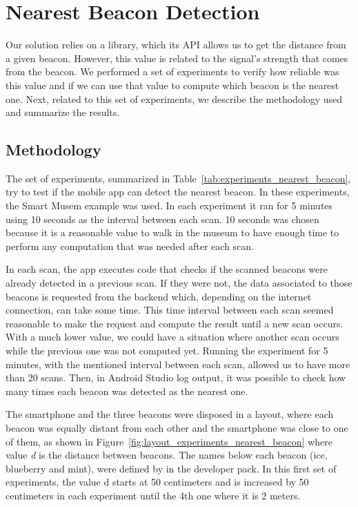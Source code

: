 \section{Nearest Beacon Detection}
\label{sec:evaluation_nearest_beacon}
Our solution relies on a library, which its \gls{API} allows us to get the distance from a given beacon.
However, this value is related to the signal's strength that comes from the beacon.
We performed a set of experiments to verify how reliable was this value and if we can use that value to compute which beacon is the nearest one.
Next, related to this set of experiments, we describe the methodology used and summarize the results.

\subsection{Methodology}
\label{sub:evaluation_nearest_beacon_methodology}
The set of experiments, summarized in Table~\ref{tab:experiments_nearest_beacon}, try to test if the mobile app can detect the nearest beacon.
In these experiments, the Smart Musem example was used.
In each experiment it ran for 5 minutes using 10 seconds as the interval between each scan.
10 seconds was chosen because it is a reasonable value to walk in the museum to have enough time to perform any computation that was needed after each scan.

In each scan, the app executes code that checks if the scanned beacons were already detected in a previous scan. If they were not, the data associated to those beacons is requested from the backend which, depending on the internet connection, can take some time.
This time interval between each scan seemed reasonable to make the request and compute the result until a new scan occurs.
With a much lower value, we could have a situation where another scan occurs while the previous one was not computed yet.
Running the experiment for 5 minutes, with the mentioned interval between each scan, allowed us to have more than 20 scans.
Then, in Android Studio log output, it was possible to check how many times each beacon was detected as the nearest one.

The smartphone and the three beacons were disposed in a layout, where each beacon was equally distant from each other and the smartphone was close to one of them, as shown in Figure~\ref{fig:layout_experiments_nearest_beacon} where value \emph{d} is the distance between beacons.
The names below each beacon (ice, blueberry and mint), were defined by  in
the developer pack.
In this first set of experiments, the value d starts at 50 centimeters and is increased by 50 centimeters in each experiment until the 4th one where it is 2 meters.


